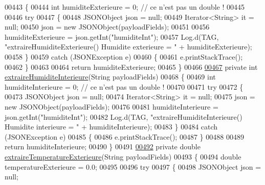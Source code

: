 \begin{DoxyCode}
{{{00443     \{
00444         \textcolor{keywordtype}{int} humiditeExterieure = 0; \textcolor{comment}{// ce n'est pas un double !}
00445 
00446         \textcolor{keywordflow}{try}
00447         \{
00448             JSONObject json = null;
00449             Iterator<String> it = null;
00450             json = \textcolor{keyword}{new} JSONObject(payloadFields);
00451 
00456             humiditeExterieure = json.getInt(\textcolor{stringliteral}{"humiditeInt"});
00457             Log.d(TAG, \textcolor{stringliteral}{"extraireHumiditeExterieure() Humidite exterieure = "} + humiditeExterieure);
00458         \}
00459         \textcolor{keywordflow}{catch} (JSONException e)
00460         \{
00461             e.printStackTrace();
00462         \}
00463 
00464         \textcolor{keywordflow}{return} humiditeExterieure;
00465     \}
00466 
\hyperlink{classcom_1_1example_1_1bee__honeyt_1_1_i_h_m_mobile_afb44a51a66e904c2b3e5229ab5144f56}{00467}     \textcolor{keyword}{private} \textcolor{keywordtype}{int} \hyperlink{classcom_1_1example_1_1bee__honeyt_1_1_i_h_m_mobile_afb44a51a66e904c2b3e5229ab5144f56}{extraireHumiditeInterieure}(String payloadFields)
00468     \{
00469         \textcolor{keywordtype}{int} humiditeInterieure = 0; \textcolor{comment}{// ce n'est pas un double !}
00470 
00471         \textcolor{keywordflow}{try}
00472         \{
00473             JSONObject json = null;
00474             Iterator<String> it = null;
00475             json = \textcolor{keyword}{new} JSONObject(payloadFields);
00476 
00481             humiditeInterieure = json.getInt(\textcolor{stringliteral}{"humiditeInt"});
00482             Log.d(TAG, \textcolor{stringliteral}{"extraireHumiditeInterieure() Humidite interieure = "} + humiditeInterieure);
00483         \}
00484         \textcolor{keywordflow}{catch} (JSONException e)
00485         \{
00486             e.printStackTrace();
00487         \}
00488 
00489         \textcolor{keywordflow}{return} humiditeInterieure;
00490     \}
00491 
\hyperlink{classcom_1_1example_1_1bee__honeyt_1_1_i_h_m_mobile_a80b9ad15fb6aa3591cf600892b1325b9}{00492}     \textcolor{keyword}{private} \textcolor{keywordtype}{double} \hyperlink{classcom_1_1example_1_1bee__honeyt_1_1_i_h_m_mobile_a80b9ad15fb6aa3591cf600892b1325b9}{extraireTemperatureExterieure}(String payloadFields)
00493     \{
00494         \textcolor{keywordtype}{double} temperatureExterieure = 0.0;
00495 
00496         \textcolor{keywordflow}{try}
00497         \{
00498             JSONObject json = null;
}}}
\end{DoxyCode}
